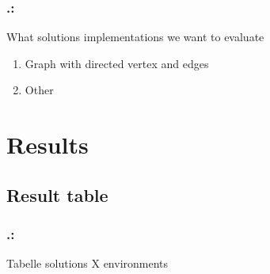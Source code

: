 \documentclass{beamer}
\begin{document}
\begin{frame}
	\frametitle{\thesection.\thesubsection   \secname : \subsecname}
	What solutions implementations we want to evaluate
	\begin{enumerate}
		\item{Graph with directed vertex and edges} 
		\item{Other} 
	\end{enumerate}
	
\end{frame}


\section{Results}

\subsection{Result table}
\begin{frame}
	\frametitle{\thesection.\thesubsection   \secname : \subsecname}
	Tabelle solutions X environments

\end{frame}
\end{document}
